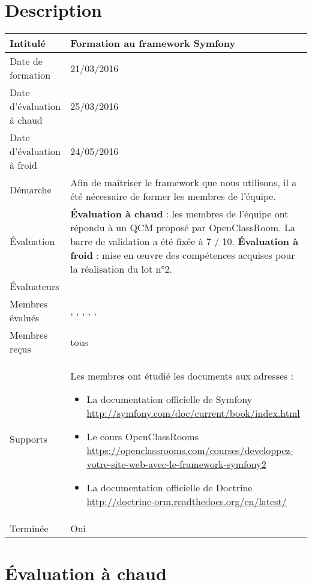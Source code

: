 \documentclass[asi, sansVersion]{picInsa}
\begin{document}
	\section*{Description}
		\begin{longtable}{|p{}|p{}|}
			\hline
			\cellcolor{gris2} Intitulé & Formation au framework Symfony\\\hline
			\cellcolor{gris2} Date de formation & 21/03/2016\\\hline
			\cellcolor{gris2} Date d'évaluation à chaud & 25/03/2016 \\\hline
			\cellcolor{gris2} Date d'évaluation à froid & 24/05/2016 \\\hline
			\cellcolor{gris2} Démarche & Afin de maîtriser le framework que nous utilisons, il a été nécessaire de former les membres de l'équipe.\\\hline
			\cellcolor{gris2} Évaluation &
				\textbf{Évaluation à chaud} : les membres de l'équipe ont répondu à un QCM proposé par OpenClassRoom. La barre de validation a été fixée à 7 / 10.\newline
				\textbf{Évaluation à froid} : mise en œuvre des compétences acquises pour la réalisation du lot n°2.\\\hline
			\cellcolor{gris2} Évaluateurs & \Florian{}\\\hline
			\cellcolor{gris2} Membres évalués & \Melissa{}, \Michel{}, \Matthieu{}, \Mathieu{}, \Kafui{}, \Julie{}\\\hline
			\cellcolor{gris2} Membres reçus & tous \\\hline
			\cellcolor{gris2} Supports & Les membres ont étudié les documents aux adresses : \begin{itemize}
			\item La documentation officielle de Symfony \url{http://symfony.com/doc/current/book/index.html}
                        \item Le cours OpenClassRooms \url{https://openclassrooms.com/courses/developpez-votre-site-web-avec-le-framework-symfony2}
                        \item La documentation officielle de Doctrine \url{http://doctrine-orm.readthedocs.org/en/latest/}
		\end{itemize}
			 \\\hline
			\cellcolor{gris2} Terminée & Oui \\\hline
		\end{longtable}
		\newpage
	\section*{Évaluation à chaud}
\end{document}
